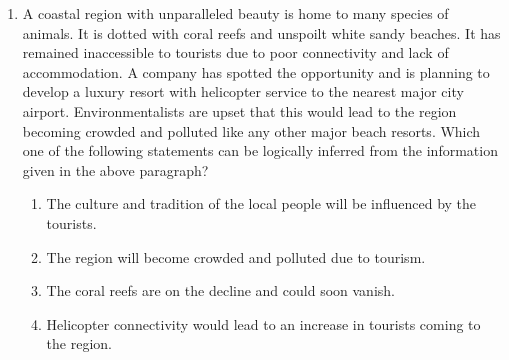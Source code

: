 \documentclass[a4paper, 11pt]{article}
\begin{document}
\begin{enumerate}
    \hfill{}

    \item A coastal region with unparalleled beauty is home to many species of animals. It is dotted with coral reefs and unspoilt white sandy beaches. It has remained inaccessible to tourists due to poor connectivity and lack of accommodation. A company has spotted the opportunity and is planning to develop a luxury resort with helicopter service to the nearest major city airport. Environmentalists are upset that this would lead to the region becoming crowded and polluted like any other major beach resorts.
    Which one of the following statements can be logically inferred from the information given in the above paragraph?
    \begin{enumerate}
        \item The culture and tradition of the local people will be influenced by the tourists.
        \item The region will become crowded and polluted due to tourism.
        \item The coral reefs are on the decline and could soon vanish.
        \item Helicopter connectivity would lead to an increase in tourists coming to the region.
    \end{enumerate}

    \hfill{}
\end{enumerate}
\end{document}
